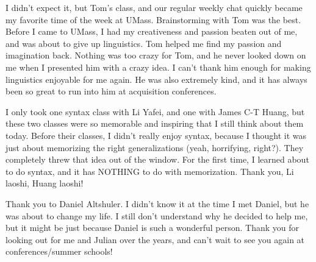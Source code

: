 I didn’t expect it, but Tom’s class, and our regular weekly chat quickly became my favorite time of the week at UMass. Brainstorming with Tom was the best. Before I came to UMass, I had my creativeness and passion beaten out of me, and was about to give up linguistics. Tom helped me find my passion and imagination back. Nothing was too crazy for Tom, and he never looked down on me when I presented him with a crazy idea. I can’t thank him enough for making linguistics enjoyable for me again. He was also extremely kind, and it has always been so great to run into him at acquisition conferences.
 
I only took one syntax class with Li Yafei, and one with James C-T Huang, but these two classes were so memorable and inspiring that I still think about them today. Before their classes, I didn’t really enjoy syntax, because I thought it was just about memorizing the right generalizations (yeah, horrifying, right?). They completely threw that idea out of the window. For the first time, I learned about  to do syntax, and it has NOTHING to do with memorization. Thank you, Li laoshi, Huang laoshi!%

Thank you to Daniel Altshuler. I didn’t know it at the time I met Daniel, but he was about to change my life. I still don’t understand why he decided to help me, but it might be just because Daniel is such a wonderful person. Thank you for looking out for me and Julian over the years, and can’t wait to see you again at conferences/summer schools!
 

